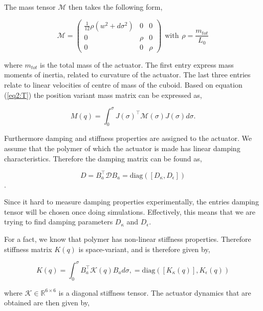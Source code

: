 The mass tensor $\mathcal{M}$ then takes the following form,

\begin{equation}
    \mathcal{M} = \begin{pmatrix} \frac{1}{12}\rho (w^2 + d\sigma^2) & 0 & 0 \\
                                   0 & \rho & 0 \\
                                   0 & 0 & \rho \end{pmatrix}\hspace{5pt} \text{with} \hspace{5pt} \rho = \frac{m_{tot}}{L_0}
\end{equation} 




where $m_{tot}$ is the total mass of the actuator. The first entry express mass moments of inertia, related to curvature of the actuator. The last three entries relate to linear velocities of centre of mass of the cuboid. Based on equation (\ref{eq2:T}) the position variant mass matrix can be expressed as, 


\begin{equation}
    M(q) = \int_0^{\sigma} J(\sigma)^\top \mathcal{M}(\sigma)J(\sigma) d \sigma.
\end{equation}

Furthermore damping and stiffness properties are assigned to the actuator. We assume that the polymer of which the actuator is made has linear damping characteristics. Therefore the damping matrix can be found as,

\begin{equation}
    D = B_a^\top \mathcal{D} B_a  = \text{diag}([D_\kappa, D_\epsilon])
\end{equation}.

Since it hard to measure damping properties experimentally, the entries damping tensor will be chosen once doing simulations. Effectively, this means that we are trying to find damping parameters $D_\kappa$ and $D_\epsilon$. 

For a fact, we know that polymer has non-linear stiffness properties. Therefore stiffness matrix $K(q)$ is space-variant, and is therefore given by,

\begin{equation}
    K(q) = \int_0^\sigma B_a^\top \mathcal{K}(q) B_a  d\sigma, = \text{diag}([K_\kappa(q)], K_\epsilon(q))
\end{equation}

where $\mathcal{K} \in \mathbb{R}^{6 \times 6}$ is a diagonal stiffness tensor. The actuator dynamics that are obtained are then given by,







